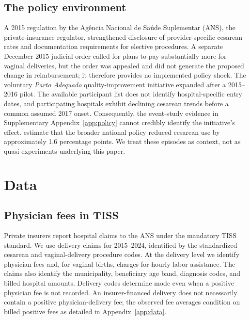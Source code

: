 \documentclass[12pt]{article}
\begin{document}
\subsection{The policy environment}

A 2015 regulation by the Agência Nacional de Saúde Suplementar (ANS), the private-insurance regulator, strengthened disclosure of provider-specific cesarean rates and documentation requirements for elective procedures. A separate December 2015 judicial order called for plans to pay substantially more for vaginal deliveries, but the order was appealed and did not generate the proposed change in reimbursement; it therefore provides no implemented policy shock. The voluntary \textit{Parto Adequado} quality-improvement initiative expanded after a 2015–2016 pilot. The available participant list does not identify hospital-specific entry dates, and participating hospitals exhibit declining cesarean trends before a common assumed 2017 onset. Consequently, the event-study evidence in Supplementary Appendix~\ref{app:policy} cannot credibly identify the initiative's effect. \citet{melo2023} estimate that the broader national policy reduced cesarean use by approximately 1.6 percentage points. We treat these episodes as context, not as quasi-experiments underlying this paper.

\section{Data}\label{sec:data}

\subsection{Physician fees in TISS}\label{sec:fees_data}

Private insurers report hospital claims to the ANS under the mandatory TISS standard. We use delivery claims for 2015–2024, identified by the standardized cesarean and vaginal-delivery procedure codes. At the delivery level we identify physician fees and, for vaginal births, charges for hourly labor assistance. The claims also identify the municipality, beneficiary age band, diagnosis codes, and billed hospital amounts. Delivery codes determine mode even when a positive physician fee is not recorded. An insurer-financed delivery does not necessarily contain a positive physician-delivery fee; the observed fee averages condition on billed positive fees as detailed in Appendix~\ref{app:data}.
\end{document}
